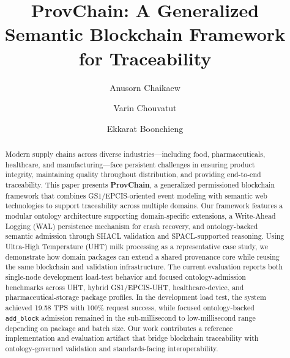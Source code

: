 \documentclass[preprint,review,12pt,authoryear]{elsarticle}
\def\orcidlink#1{}%
\def\corref#1{}%
\begin{document}
\hypersetup{pageanchor=false}
\begin{frontmatter}

\title{ProvChain: A Generalized Semantic Blockchain Framework for Traceability}

\author[1]{Anusorn Chaikaew\orcidlink{0000-0002-4715-677X}}

\author[1]{Varin Chouvatut\orcidlink{0009-0008-9125-4650}}

\author[1]{Ekkarat Boonchieng\orcidlink{0000-0002-7584-1627}\corref{cor1}}


\address[1]{Department of Computer Science, Faculty of Science, Chiang Mai University, Chiang Mai 50200, Thailand}

\begin{abstract}
Modern supply chains across diverse industries---including food, pharmaceuticals, healthcare, and manufacturing---face persistent challenges in ensuring product integrity, maintaining quality throughout distribution, and providing end-to-end traceability. This paper presents \textbf{ProvChain}, a generalized permissioned blockchain framework that combines GS1/EPCIS-oriented event modeling with semantic web technologies to support traceability across multiple domains. Our framework features a modular ontology architecture supporting domain-specific extensions, a Write-Ahead Logging (WAL) persistence mechanism for crash recovery, and ontology-backed semantic admission through SHACL validation and SPACL-supported reasoning. Using Ultra-High Temperature (UHT) milk processing as a representative case study, we demonstrate how domain packages can extend a shared provenance core while reusing the same blockchain and validation infrastructure. The current evaluation reports both single-node development load-test behavior and focused ontology-admission benchmarks across UHT, hybrid GS1/EPCIS-UHT, healthcare-device, and pharmaceutical-storage package profiles. In the development load test, the system achieved 19.58 TPS with 100\% request success, while focused ontology-backed \texttt{add\_block} admission remained in the sub-millisecond to low-millisecond range depending on package and batch size. Our work contributes a reference implementation and evaluation artifact that bridge blockchain traceability with ontology-governed validation and standards-facing interoperability.
\end{abstract}


\end{frontmatter}
\end{document}
